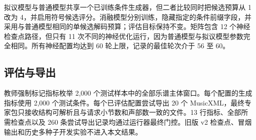 拟议模型与普通模型共享一个已训练条件生成器，但二者比较同时把候选预算从 1 改为 4，并启用符号候选评分。消融模型分别训练，隐藏指定的条件前缀字段，并采用与普通模型相同的单候选解码预算；评估目标保持不变。矩阵包含 12 个神经检查点路径，但只有 11 次不同的神经优化运行，因为普通模型与拟议模型参数完全相同。所有神经配置均达到 60 轮上限，记录的最佳轮次介于 56 至 60。

\subsection{评估与导出}

教师强制标记指标枚举 2,000 个测试样本中的全部乐谱主体窗口。每个配置的生成指标使用 2,000 个测试条件。每个已评估配置尝试导出 20 个 MusicXML，最终专家包只接收结构可解析且与请求小节数和声部数一致的文件。13 行指标、全部所需检查点以及 260 条尝试导出记录均通过运行器最终门控。旧版 v2 检查点、冒烟输出和历史多种子开发实验不进入本文结果。
